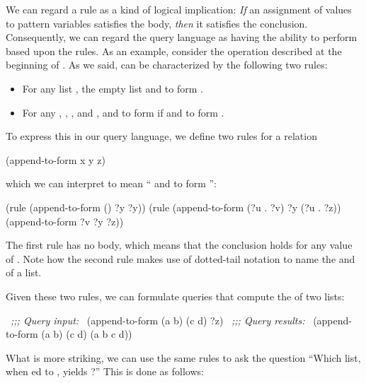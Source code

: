 We can regard a rule as a kind of logical implication: \emph{If} an assignment
of values to pattern variables satisfies the body, \emph{then} it satisfies the
conclusion.  Consequently, we can regard the query language as having the
ability to perform  based upon the rules.  As an
example, consider the  operation described at the beginning of
.  As we said,  can be characterized by the
following two rules:

\begin{itemize}
\item
For any list , the empty list and   to form
.

\item
For any , , , and ,  and
  to form  if  and 
 to form .
\end{itemize}

\noindent
To express this in our query language, we define two rules for a relation

\begin{codeBlock}
(append-to-form x y z)
\end{codeBlock}

\noindent
which we can interpret to mean `` and   to form
'':

\begin{codeBlock}
(rule (append-to-form () ?y ?y))
(rule (append-to-form (?u . ?v) ?y (?u . ?z))
      (append-to-form ?v ?y ?z))
\end{codeBlock}

\noindent
The first rule has no body, which means that the conclusion holds for any value
of .  Note how the second rule makes use of dotted-tail notation to
name the  and  of a list.

Given these two rules, we can formulate queries that compute the 
of two lists:

\begin{codeBlock}
~\textit{;;; Query input:}~
(append-to-form (a b) (c d) ?z)
~\textit{;;; Query results:}~
(append-to-form (a b) (c d) (a b c d))
\end{codeBlock}

\noindent
What is more striking, we can use the same rules to ask the question ``Which
list, when ed to , yields ?''  This is
done as follows:


